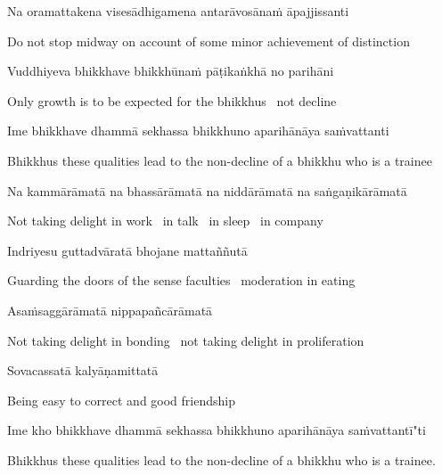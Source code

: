 Na oramattakena visesādhigamena antarāvosānaṁ āpajjissanti

\begin{english}
  Do not stop midway on account of some minor achievement of distinction
\end{english}

Vuddhiyeva bhikkhave bhikkhūnaṁ pāṭikaṅkhā no parihāni

\begin{english}
  Only growth is to be expected for the bhikkhus \breathmark\ not decline
\end{english}

\suttaRef{[AN 7.23-27]}

Ime bhikkhave dhammā sekhassa bhikkhuno aparihānāya saṁvattanti

\begin{english}
  Bhikkhus these qualities lead to the non-decline of a bhikkhu who is a trainee
\end{english}

Na kammārāmatā na bhassārāmatā na niddārāmatā na saṅgaṇikārāmatā

\begin{english}
  Not taking delight in work \breathmark\ in talk \breathmark\ in sleep \breathmark\ in company
\end{english}

Indriyesu guttadvāratā bhojane mattaññutā

\begin{english}
  Guarding the doors of the sense faculties \breathmark\ moderation in eating
\end{english}

Asaṁsaggārāmatā nippapañcārāmatā

\begin{english}
  Not taking delight in bonding \breathmark\ not taking delight in proliferation
\end{english}

Sovacassatā kalyāṇamittatā

\begin{english}
  Being easy to correct and good friendship
\end{english}

Ime kho bhikkhave dhammā sekhassa bhikkhuno aparihānāya saṁvattantī"ti

\begin{english}
  Bhikkhus these qualities lead to the non-decline of a bhikkhu who is a trainee.
\end{english}

